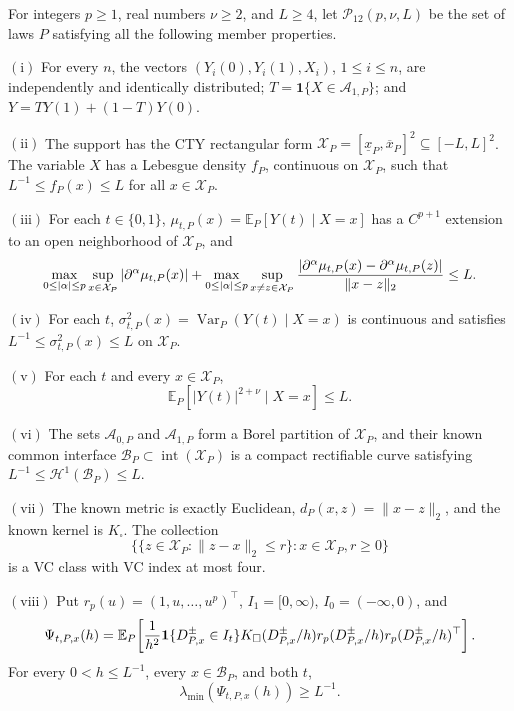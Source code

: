 For integers \(p\geq1\), real numbers \(\nu\geq2\), and \(L\geq4\), let \(\mathcal P_{12}(p,\nu,L)\) be the set of laws \(P\) satisfying all the following member properties.

\(\mathrm{(i)}\) For every \(n\), the vectors \((Y_i(0),Y_i(1),X_i)\), \(1\leq i\leq n\), are independently and identically distributed; \(T=\mathbf 1\{X\in\mathcal A_{1,P}\}\); and \(Y=TY(1)+(1-T)Y(0)\).

\(\mathrm{(ii)}\) The support has the CTY rectangular form \(\mathcal X_P=[\underline x_P,\overline x_P]^2\subseteq[-L,L]^2\).  The variable \(X\) has a Lebesgue density \(f_P\), continuous on \(\mathcal X_P\), such that \(L^{-1}\leq f_P(x)\leq L\) for all \(x\in\mathcal X_P\).

\(\mathrm{(iii)}\) For each \(t\in\{0,1\}\), \(\mu_{t,P}(x)=\mathbb E_P[Y(t)\mid X=x]\) has a \(C^{p+1}\) extension to an open neighborhood of \(\mathcal X_P\), and
\[
 \max_{0\leq|\alpha|\leq p}\sup_{x\in\mathcal X_P}|\partial^\alpha\mu_{t,P}(x)|
 +\max_{0\leq|\alpha|\leq p}\sup_{x\neq z\in\mathcal X_P}
 { |\partial^\alpha\mu_{t,P}(x)-\partial^\alpha\mu_{t,P}(z)|\over\lVert x-z\rVert_2}
 \leq L.
\]

\(\mathrm{(iv)}\) For each \(t\), \(\sigma^2_{t,P}(x)=\operatorname{Var}_P(Y(t)\mid X=x)\) is continuous and satisfies \(L^{-1}\leq\sigma^2_{t,P}(x)\leq L\) on \(\mathcal X_P\).

\(\mathrm{(v)}\) For each \(t\) and every \(x\in\mathcal X_P\),
\[
 \mathbb E_P[|Y(t)|^{2+\nu}\mid X=x]\leq L.
\]

\(\mathrm{(vi)}\) The sets \(\mathcal A_{0,P}\) and \(\mathcal A_{1,P}\) form a Borel partition of \(\mathcal X_P\), and their known common interface \(\mathcal B_P\subset\operatorname{int}(\mathcal X_P)\) is a compact rectifiable curve satisfying \(L^{-1}\leq\mathcal H^1(\mathcal B_P)\leq L\).

\(\mathrm{(vii)}\) The known metric is exactly Euclidean, \(d_P(x,z)=\lVert x-z\rVert_2\), and the known kernel is \(K_\square\).  The collection
\[
 \{\{z\in\mathcal X_P:\lVert z-x\rVert_2\leq r\}:x\in\mathcal X_P, r\geq0\}
\]
is a VC class with VC index at most four.

\(\mathrm{(viii)}\) Put \(r_p(u)=(1,u,\ldots,u^p)^\top\), \(I_1=[0,\infty)\), \(I_0=(-\infty,0)\), and
\[
 \Psi_{t,P,x}(h)=\mathbb E_P\!\left[
 {1\over h^2}\mathbf 1\{D^{\pm}_{P,x}\in I_t\}K_\square(D^{\pm}_{P,x}/h)
 r_p(D^{\pm}_{P,x}/h)r_p(D^{\pm}_{P,x}/h)^\top
 \right].
\]
For every \(0<h\leq L^{-1}\), every \(x\in\mathcal B_P\), and both \(t\),
\[
 \lambda_{\min}(\Psi_{t,P,x}(h))\geq L^{-1}.
\]

